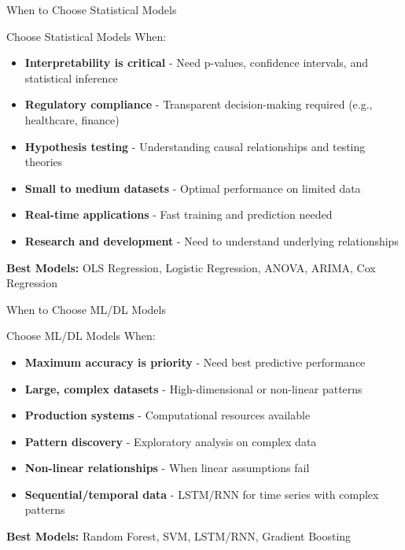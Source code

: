 \documentclass[aspectratio=169,10pt]{beamer}
\begin{document}
\begin{frame}{When to Choose Statistical Models}
\begin{block}{\textcolor{statcolor}{Choose Statistical Models When:}}
\begin{itemize}
\item \textcolor{statcolor}{\textbf{Interpretability is critical}} - Need p-values, confidence intervals, and statistical inference
\item \textcolor{statcolor}{\textbf{Regulatory compliance}} - Transparent decision-making required (e.g., healthcare, finance)
\item \textcolor{statcolor}{\textbf{Hypothesis testing}} - Understanding causal relationships and testing theories
\item \textcolor{statcolor}{\textbf{Small to medium datasets}} - Optimal performance on limited data
\item \textcolor{statcolor}{\textbf{Real-time applications}} - Fast training and prediction needed
\item \textcolor{statcolor}{\textbf{Research and development}} - Need to understand underlying relationships
\end{itemize}
\end{block}

\vspace{0.3cm}

\begin{center}
\textbf{Best Models:} OLS Regression, Logistic Regression, ANOVA, ARIMA, Cox Regression
\end{center}
\end{frame}

\begin{frame}{When to Choose ML/DL Models}
\begin{block}{\textcolor{mlcolor}{Choose ML/DL Models When:}}
\begin{itemize}
\item \textcolor{mlcolor}{\textbf{Maximum accuracy is priority}} - Need best predictive performance
\item \textcolor{mlcolor}{\textbf{Large, complex datasets}} - High-dimensional or non-linear patterns
\item \textcolor{mlcolor}{\textbf{Production systems}} - Computational resources available
\item \textcolor{mlcolor}{\textbf{Pattern discovery}} - Exploratory analysis on complex data
\item \textcolor{mlcolor}{\textbf{Non-linear relationships}} - When linear assumptions fail
\item \textcolor{dlcolor}{\textbf{Sequential/temporal data}} - LSTM/RNN for time series with complex patterns
\end{itemize}
\end{block}

\vspace{0.3cm}

\begin{center}
\textbf{Best Models:} Random Forest, SVM, LSTM/RNN, Gradient Boosting
\end{center}
\end{frame}
\end{document}
